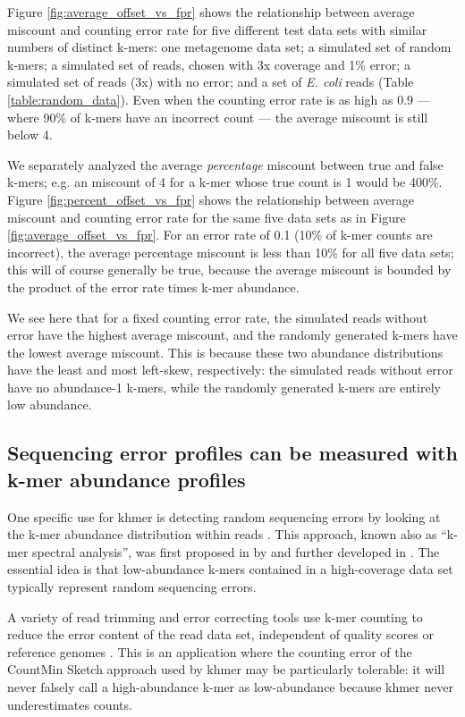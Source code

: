 \documentclass[10pt]{article}
\begin{document}
Figure \ref{fig:average_offset_vs_fpr} shows the relationship between
average miscount and counting error rate for five different test data
sets with similar numbers of distinct k-mers: one metagenome data
set; a simulated set of random k-mers; a simulated set of reads,
chosen with 3x coverage and 1\% error; a simulated set of reads (3x)
with no error; and a set of {\em E. coli} reads (Table \ref{table:random_data}).  
Even when the counting error rate is as high as 0.9 ---
where 90\% of k-mers have an incorrect count --- the average miscount is still
below 4.

We separately analyzed the average {\em percentage} miscount between
true and false k-mers; e.g. an miscount of 4 for a k-mer whose true
count is 1 would be 400\%.  Figure \ref{fig:percent_offset_vs_fpr} shows 
the relationship between average miscount and counting error rate for 
the same five data sets as in Figure \ref{fig:average_offset_vs_fpr}.  
For an error rate of 0.1 (10\% of k-mer counts are incorrect), 
the average percentage miscount is less than 10\% for all five data 
sets; this will of course generally be true, 
because the average miscount is bounded by the product of the error 
rate times k-mer abundance.

We see here that for a fixed counting error rate, the simulated reads
without error have the highest average miscount, and the randomly generated
k-mers have the lowest average miscount.  This is because these two
abundance distributions have the least and most left-skew,
respectively: the simulated reads without error have no abundance-1
k-mers, while the randomly generated k-mers are entirely low abundance.

\subsection*{Sequencing error profiles can be measured with k-mer abundance
profiles}

One specific use for khmer is detecting random sequencing errors by
looking at the k-mer abundance distribution within reads
\cite{Medvedev2011}.  This approach, known also as ``k-mer spectral
analysis'', was first proposed in by \cite{pubmed11504945} and further
developed in \cite{pubmed12902383}.  The essential idea is that
low-abundance k-mers contained in a high-coverage data set typically
represent random sequencing errors.

A variety of read trimming and error correcting tools use k-mer
counting to reduce the error content of the read data set, independent
of quality scores or reference genomes \cite{Kelley2010}.  This is an
application where the counting error of the CountMin Sketch approach
used by khmer may be particularly tolerable: it will never falsely
call a high-abundance k-mer as low-abundance because khmer never
underestimates counts.
\end{document}
